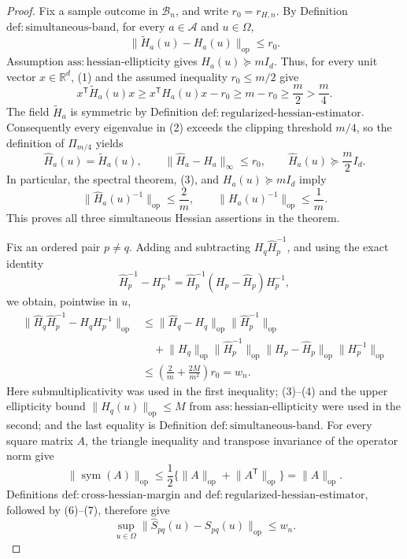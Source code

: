 \documentclass{article}
\begin{document}
\begin{proof}
Fix a sample outcome in \(\mathcal B_n\), and write \(r_0=r_{H,n}\).  By Definition \(\mathrm{def:simultaneous\text{-}band}\), for every \(a\in\mathcal A\) and \(u\in\Omega\),
\[
 \lVert\widetilde H_a(u)-H_a(u)\rVert_{\mathrm{op}}\le r_0.
 \tag{1}
\]
Assumption \(\mathrm{ass:hessian\text{-}ellipticity}\) gives \(H_a(u)\succeq mI_d\).  Thus, for every unit vector \(x\in\mathbb R^d\), (1) and the assumed inequality \(r_0\le m/2\) give
\[
 x^{\mathsf T}\widetilde H_a(u)x
 \ge x^{\mathsf T}H_a(u)x-r_0
 \ge m-r_0
 \ge \frac m2>\frac m4.
 \tag{2}
\]
The field \(\widetilde H_a\) is symmetric by Definition \(\mathrm{def:regularized\text{-}hessian\text{-}estimator}\).  Consequently every eigenvalue in (2) exceeds the clipping threshold \(m/4\), so the definition of \(\Pi_{m/4}\) yields
\[
 \widehat H_a(u)=\widetilde H_a(u),
 \qquad
 \lVert\widehat H_a-H_a\rVert_\infty\le r_0,
 \qquad
 \widehat H_a(u)\succeq\frac m2I_d.
 \tag{3}
\]
In particular, the spectral theorem, (3), and \(H_a(u)\succeq mI_d\) imply
\[
 \lVert\widehat H_a(u)^{-1}\rVert_{\mathrm{op}}\le\frac2m,
 \qquad
 \lVert H_a(u)^{-1}\rVert_{\mathrm{op}}\le\frac1m.
 \tag{4}
\]
This proves all three simultaneous Hessian assertions in the theorem.

Fix an ordered pair \(p\ne q\).  Adding and subtracting \(H_q\widehat H_p^{-1}\), and using the exact identity
\[
 \widehat H_p^{-1}-H_p^{-1}
 =\widehat H_p^{-1}(H_p-\widehat H_p)H_p^{-1},
 \tag{5}
\]
we obtain, pointwise in \(u\),
\[
\begin{aligned}
 \lVert\widehat H_q\widehat H_p^{-1}-H_qH_p^{-1}\rVert_{\mathrm{op}}
 &\le
 \lVert\widehat H_q-H_q\rVert_{\mathrm{op}}
 \lVert\widehat H_p^{-1}\rVert_{\mathrm{op}}\\
 &\quad+
 \lVert H_q\rVert_{\mathrm{op}}
 \lVert\widehat H_p^{-1}\rVert_{\mathrm{op}}
 \lVert H_p-\widehat H_p\rVert_{\mathrm{op}}
 \lVert H_p^{-1}\rVert_{\mathrm{op}}\\
 &\le
 \left(\frac2m+\frac{2M}{m^2}\right)r_0
 =w_n.
\end{aligned}
 \tag{6}
\]
Here submultiplicativity was used in the first inequality; (3)--(4) and the upper ellipticity bound \(\lVert H_q(u)\rVert_{\mathrm{op}}\le M\) from \(\mathrm{ass:hessian\text{-}ellipticity}\) were used in the second; and the last equality is Definition \(\mathrm{def:simultaneous\text{-}band}\).  For every square matrix \(A\), the triangle inequality and transpose invariance of the operator norm give
\[
 \lVert\operatorname{sym}(A)\rVert_{\mathrm{op}}
 \le\frac12\{\lVert A\rVert_{\mathrm{op}}+\lVert A^{\mathsf T}\rVert_{\mathrm{op}}\}
 =\lVert A\rVert_{\mathrm{op}}.
 \tag{7}
\]
Definitions \(\mathrm{def:cross\text{-}hessian\text{-}margin}\) and \(\mathrm{def:regularized\text{-}hessian\text{-}estimator}\), followed by (6)--(7), therefore give
\[
 \sup_{u\in\Omega}
 \lVert\widehat S_{pq}(u)-S_{pq}(u)\rVert_{\mathrm{op}}
 \le w_n.
 \tag{8}
\]


\end{proof}
\end{document}
